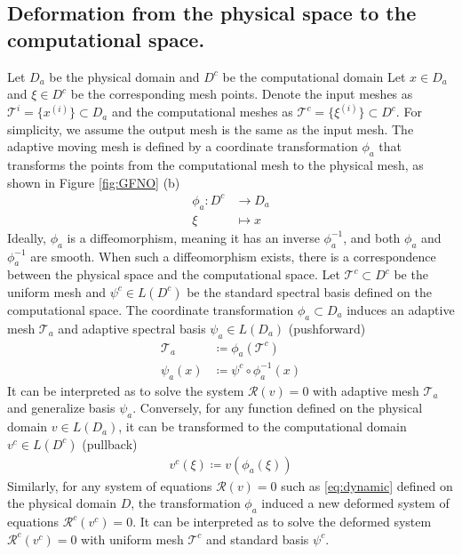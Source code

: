 \documentclass{article}
\newcommand{\T}{\mathcal{T}}
\begin{document}
\subsection{Deformation from the physical space to the computational space.}
Let $D_a$ be the physical domain and $D^c$ be the computational domain Let $x\in D_a$ and $\xi \in D^c$ be the corresponding mesh points. Denote the input meshes as $\T^i = \{x^{(i)}\} \subset D_a$ and the computational meshes as $\T^c = \{\xi^{(i)}\} \subset D^c$. For simplicity, we assume the output mesh is the same as the input mesh.
The adaptive moving mesh is defined by a coordinate transformation $\phi_a$ that transforms the points from the computational mesh to the physical mesh, as shown in Figure \ref{fig:GFNO} (b)
\begin{equation}
\begin{split}
    \phi_a: D^c &\to D_a\\
     \xi &\mapsto x 
\end{split}
\end{equation}
Ideally, $\phi_a$ is a diffeomorphism, meaning it has an inverse $\phi_a^{-1}$, and both $\phi_a$ and $\phi_a^{-1}$ are smooth. When such a diffeomorphism exists, there is a correspondence between the physical space and the computational space.
Let $\T^c \subset D^c$ be the uniform mesh and $\psi^c \in L(D^c)$ be the standard spectral basis defined on the computational space. The coordinate transformation $\phi_a \subset D_a$ induces an adaptive mesh $\T_a$ and adaptive spectral basis $\psi_a \in L(D_a)$ (pushforward)  
\begin{equation}
\begin{split}
    \T_a &\coloneqq \phi_a(\T^c)\\
    \psi_a(x) &\coloneqq \psi^c\circ\phi_a^{-1}(x) 
\end{split}
\end{equation}
It can be interpreted as to solve the system $\mathcal{R}(v)=0$ with adaptive mesh $\T_a$ and generalize basis $\psi_a$. Conversely, for any function defined on the physical domain $v \in L(D_a)$, it can be transformed to the computational domain $v^c \in L(D^c)$ (pullback) 
\begin{equation}
\begin{split}
     v^c(\xi) \coloneqq  v(\phi_a(\xi)) 
\end{split}
\end{equation}
Similarly, for any system of equations $\mathcal{R}(v)=0$ such as \eqref{eq:dynamic} defined on the physical domain $D$, the transformation $\phi_a$ induced a new deformed system of equations $\mathcal{R}^c(v^c)=0$.
It can be interpreted as to solve the deformed system $\mathcal{R}^c(v^c)=0$ with uniform mesh $\T^c$ and standard basis $\psi^c$.
\end{document}
